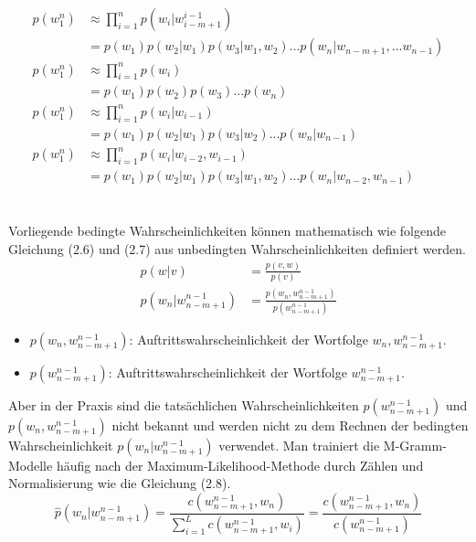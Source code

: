 \begin{align}
p(w_{1}^n) & \approx \prod_{i=1}^n p(w_{i}|w_{i-m+1}^{i-1})\nonumber \\
					 &=p(w_{1})p(w_{2}|w_{1})p(w_{3}|w_{1},w_{2})...p(w_{n}|w_{n-m+1},...w_{n-1})\\
p(w_{1}^n) & \approx \prod_{i=1}^n p(w_{i})\nonumber \\
					 &=p(w_{1})p(w_{2})p(w_{3})...p(w_{n})\\	
p(w_{1}^n) & \approx \prod_{i=1}^n p(w_{i}|w_{i-1})\nonumber \\
					 &=p(w_{1})p(w_{2}|w_{1})p(w_{3}|w_{2})...p(w_{n}|w_{n-1}) \\				 
p(w_{1}^n) & \approx \prod_{i=1}^n p(w_{i}|w_{i-2},w_{i-1})\nonumber \\
					 &=p(w_{1})p(w_{2}|w_{1})p(w_{3}|w_{1},w_{2})...p(w_{n}|w_{n-2},w_{n-1})
\end{align}
\\
\\
Vorliegende bedingte Wahrscheinlichkeiten k\"onnen mathematisch wie folgende Gleichung (2.6) und (2.7)  aus unbedingten Wahrscheinlichkeiten definiert werden.
\begin{align}
p(w|v) &=\frac{p(v,w)}{p(v)} \\
p(w_{n}|w_{n-m+1}^{n-1}) &=\frac{p(w_{n},w_{n-m+1}^{n-1} )}{p(w_{n-m+1}^{n-1})} 
\end{align}
\begin{itemize}
	\item $p(w_{n},w_{n-m+1}^{n-1})$: Auftrittswahrscheinlichkeit der Wortfolge $w_{n},w_{n-m+1}^{n-1}$.\\
	\item $p(w_{n-m+1}^{n-1})$: Auftrittswahrscheinlichkeit der Wortfolge $w_{n-m+1}^{n-1}$.
\end{itemize}
Aber in der Praxis sind die tats\"achlichen Wahrscheinlichkeiten $p(w_{n-m+1}^{n-1})$  und \\ $p(w_{n},w_{n-m+1}^{n-1})$ nicht bekannt und werden nicht zu dem Rechnen der bedingten Wahrscheinlichkeit $p(w_{n}|w_{n-m+1}^{n-1})$ verwendet. Man trainiert die M-Gramm-Modelle h\"aufig nach der Maximum-Likelihood-Methode \cite{int_MLE} durch Z\"ahlen und Normalisierung wie die Gleichung (2.8). 
\begin{equation}
\hat{p}(w_{n}|w_{n-m+1}^{n-1})=\frac{c(w_{n-m+1}^{n-1},w_{n} )}{ \sum_{i=1}^L c(w_{n-m+1}^{n-1},w_{i})}=\frac{c(w_{n-m+1}^{n-1},w_{n} )}{c(w_{n-m+1}^{n-1})}
\end{equation}
\\
